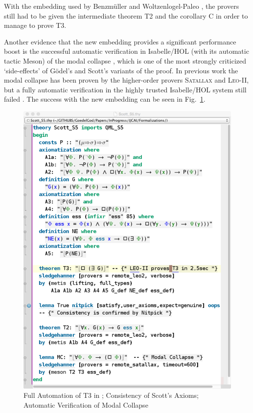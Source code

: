\documentclass{article}
\begin{document}
With the embedding used by Benzm\"uller and Woltzenlogel-Paleo , the
provers still had to be given the intermediate theorem T2 and the corollary
C in order to manage to prove T3.

Another evidence that the new embedding provides a significant performance boost 
is the successful automatic verification in Isabelle/HOL (with its automatic tactic Meson) of the modal
collapse \cite{Sobel}, which is one of the most strongly criticized
`side-effects' of G\"odel's and Scott's variants of the proof. In previous work 
the modal collapse has been proven by the higher-order provers
\textsc{Satallax} \cite{Satallax} and \textsc{Leo-II}, but a fully automatic
verification in the highly trusted Isabelle/HOL system still failed
\cite{J28}.  The success with the new embedding can be seen in Fig.~\ref{Scott_S5}.

\begin{figure}[t]
\centerline{\includegraphics[width=\columnwidth]{./Images/Scott_S5.png}}
\caption{Full Automation of T3 in \SFiveU; Consistency of Scott's
  Axioms;  Automatic Verification of Modal Collapse} \label{Scott_S5}
\end{figure}
\end{document}
